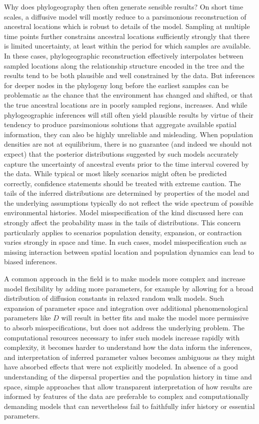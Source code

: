 \documentclass[aps,rmp, twocolumn]{revtex4}
\begin{document}
Why does phylogeography then often generate sensible results?
On short time scales, a diffusive model will mostly reduce to a parsimonious reconstruction of ancestral locations which is robust to details of the model.
Sampling at multiple time points further constrains ancestral locations sufficiently strongly that there is limited uncertainty, at least within the period for which samples are available.
In these cases, phylogeographic reconstruction effectively interpolates between sampled locations along the relationship structure encoded in the tree and the results tend to be both plausible and well constrained by the data.
But inferences for deeper nodes in the phylogeny long before the earliest samples can be problematic as the chance that the environment has changed and shifted, or that the true ancestral locations are in poorly sampled regions, increases.
And while phylogeographic inferences will still often yield plausible results by virtue of their tendency to produce parsimonious solutions that aggregate available spatial information, they can also be highly unreliable and misleading.
When population densities are not at equilibrium, there is no guarantee (and indeed we should not expect) that the posterior distributions suggested by such models accurately capture the uncertainty of ancestral events prior to the time interval covered by the data.
While typical or most likely scenarios might often be predicted correctly, confidence statements should be treated with extreme caution.
The tails of the inferred distributions are determined by properties of the model and the underlying assumptions typically do not reflect the wide spectrum of possible environmental histories. Model misspecification of the kind discussed here can strongly affect the probability mass in the tails of distributions.
This concern particularly applies to scenarios population density, expansion, or contraction varies strongly in space and time. In such cases, model misspecification such as missing interaction between spatial location and population dynamics can lead to biased inferences.

A common approach in the field is to make models more complex and increase model flexibility by adding more parameters, for example by allowing for a broad distribution of diffusion constants in relaxed random walk models.
Such expansion of parameter space and integration over additional phenomenological parameters like $D$ will result in better fits and make the model more permissive to absorb misspecifications, but does not address the underlying problem.
The computational resources necessary to infer such models increase rapidly with complexity, it becomes harder to understand how the data inform the inferences, and interpretation of inferred parameter values becomes ambiguous as they might have absorbed effects that were not explicitly modeled.
In absence of a good understanding of the dispersal properties and the population history in time and space, simple approaches that allow transparent interpretation of how results are informed by features of the data are preferable to complex and computationally demanding models that can nevertheless fail to faithfully infer history or essential parameters.
\end{document}
